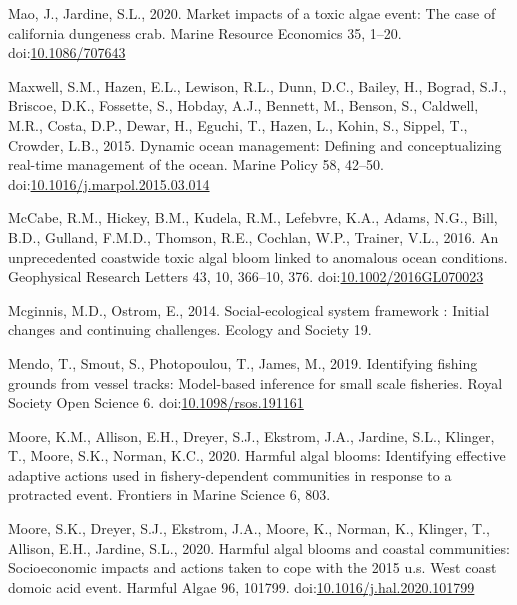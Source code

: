\documentclass[]{elsarticle} %
\begin{document}
\leavevmode\hypertarget{ref-Mao2020}{}%
Mao, J., Jardine, S.L., 2020. Market impacts of a toxic algae event: The
case of california dungeness crab. Marine Resource Economics 35, 1--20.
doi:\href{https://doi.org/10.1086/707643}{10.1086/707643}

\leavevmode\hypertarget{ref-Maxwell2015}{}%
Maxwell, S.M., Hazen, E.L., Lewison, R.L., Dunn, D.C., Bailey, H.,
Bograd, S.J., Briscoe, D.K., Fossette, S., Hobday, A.J., Bennett, M.,
Benson, S., Caldwell, M.R., Costa, D.P., Dewar, H., Eguchi, T., Hazen,
L., Kohin, S., Sippel, T., Crowder, L.B., 2015. Dynamic ocean
management: Defining and conceptualizing real-time management of the
ocean. Marine Policy 58, 42--50.
doi:\href{https://doi.org/10.1016/j.marpol.2015.03.014}{10.1016/j.marpol.2015.03.014}

\leavevmode\hypertarget{ref-McCabe2016a}{}%
McCabe, R.M., Hickey, B.M., Kudela, R.M., Lefebvre, K.A., Adams, N.G.,
Bill, B.D., Gulland, F.M.D., Thomson, R.E., Cochlan, W.P., Trainer,
V.L., 2016. An unprecedented coastwide toxic algal bloom linked to
anomalous ocean conditions. Geophysical Research Letters 43, 10,
366--10, 376.
doi:\href{https://doi.org/10.1002/2016GL070023}{10.1002/2016GL070023}

\leavevmode\hypertarget{ref-Mcginnis2014}{}%
Mcginnis, M.D., Ostrom, E., 2014. Social-ecological system framework :
Initial changes and continuing challenges. Ecology and Society 19.

\leavevmode\hypertarget{ref-Mendo2019}{}%
Mendo, T., Smout, S., Photopoulou, T., James, M., 2019. Identifying
fishing grounds from vessel tracks: Model-based inference for small
scale fisheries. Royal Society Open Science 6.
doi:\href{https://doi.org/10.1098/rsos.191161}{10.1098/rsos.191161}

\leavevmode\hypertarget{ref-Moore2020harmful}{}%
Moore, K.M., Allison, E.H., Dreyer, S.J., Ekstrom, J.A., Jardine, S.L.,
Klinger, T., Moore, S.K., Norman, K.C., 2020. Harmful algal blooms:
Identifying effective adaptive actions used in fishery-dependent
communities in response to a protracted event. Frontiers in Marine
Science 6, 803.

\leavevmode\hypertarget{ref-Moore2020}{}%
Moore, S.K., Dreyer, S.J., Ekstrom, J.A., Moore, K., Norman, K.,
Klinger, T., Allison, E.H., Jardine, S.L., 2020. Harmful algal blooms
and coastal communities: Socioeconomic impacts and actions taken to cope
with the 2015 u.s. West coast domoic acid event. Harmful Algae 96,
101799.
doi:\href{https://doi.org/10.1016/j.hal.2020.101799}{10.1016/j.hal.2020.101799}
\end{document}
